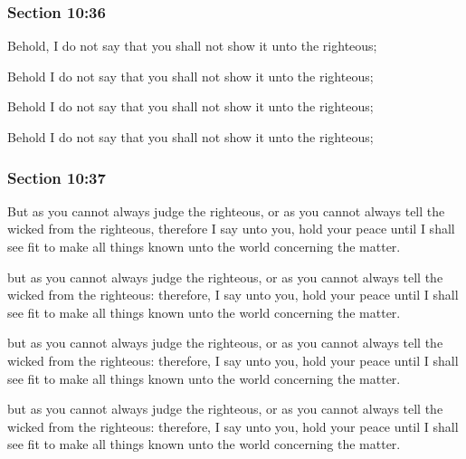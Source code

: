 	\subsubsection{Section 10:36} %
		\label{DC10-36}

		Behold, I do not say that you shall not show it unto the righteous;

		\begin{framed}
		\scriptsize
			\begin{compactdesc}
				\item[JSP] Behold I do not say that you shall not show it unto the righteous;
				\item[RB1] [\textit{missing}] 
				\item[DC 1835] Behold I do not say that you shall not show it unto the righteous;
				\item[DC 1844] Behold I do not say that you shall not show it unto the righteous; 
			\end{compactdesc}
		\end{framed}

	\subsubsection{Section 10:37} %
		\label{DC10-37}

		But as you cannot always judge the righteous, or as you cannot always tell the wicked from the righteous, therefore I say unto you, hold your peace until I shall see fit to make all things known unto the world concerning the matter.

		\begin{framed}
		\scriptsize
			\begin{compactdesc}
				\item[JSP] but as you cannot always judge the righteous, or as you cannot always tell the wicked from the righteous: therefore, I say unto you, hold your peace until I shall see fit to make all things known unto the world concerning the matter.
				\item[RB1] [\textit{missing}] 
				\item[DC 1835] but as you cannot always judge the righteous, or as you cannot always tell the wicked from the righteous: therefore, I say unto you, hold your peace until I shall see fit to make all things known unto the world concerning the matter.
				\item[DC 1844] but as you cannot always judge the righteous, or as you cannot always tell the wicked from the righteous: therefore, I say unto you, hold your peace until I shall see fit to make all things known unto the world concerning the matter.
			\end{compactdesc}
		\end{framed}

